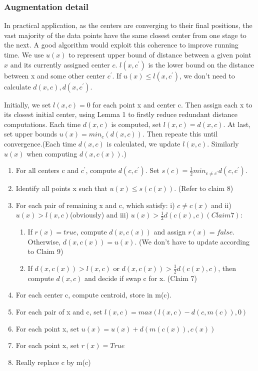 \documentclass[11pt]{article}
\begin{document}
\subsubsection{Augmentation detail}
In practical application, as the centers are converging to their final positions, the vast majority of the data points have the same closest center from one stage to the next. A good algorithm would exploit this coherence to improve running time. We use $u(x)$ to represent upper bound of distance between a given point $x$ and its currently assigned center $c$. $l(x,c^{\prime})$ is the lower bound on the distance between x and some other center $c^{\prime}$. If $u(x) \le l(x,c^{\prime}) $, we don't need to calculate $d(x,c), d(x, c^{\prime})$. \par
Initially, we set $l(x,c)=0$ for each point x and center c. Then assign each x to its closest initial center, using Lemma 1 to firstly reduce redundant distance computations. Each time $d(x,c)$ is computed, set $l(x,c)=d(x,c)$. At last, set upper bounds $u(x) = min_c(d(x,c))$. Then repeate this until convergence.(Each time $d(x,c)$ is calculated, we update $l(x,c)$. Similarly $u(x)$ when computing $d(x,c(x))$.)

\begin{enumerate}
\item For all centers c and $c^{\prime}$, compute $d(c, c^{\prime})$. Set $s(c) = \frac{1}{2}min_{c \ne c^{\prime}}d(c,c^{\prime})$.
\item Identify all points x such that $u(x) \le s(c(x))$. (Refer to claim 8)
\item For each pair of remaining x and c, which satisfy: i) $c \ne c(x)$ and ii) $u(x) > l(x,c)$(obviously) and iii) $u(x) > \frac{1}{2}d(c(x), c)(Claim 7)$: 
\begin{enumerate}
\item If $r(x) = true$, compute $d(x,c(x))$ and assign $r(x)=false$. Otherwise, $d(x,c(x)) = u(x).$ (We don't have to update according to Claim 9)
\item  If $d(x,c(x))> l(x,c)$ or $d(x,c(x)) > \frac{1}{2}d(c(x), c)$, then compute $d(x,c)$ and decide if swap c for x. (Claim 7)
\end{enumerate}
\item For each center c, compute centroid, store in m(c).
\item For each  pair of x and c, set $l(x,c) = max(l(x,c) - d(c,m(c)), 0)$
\item For each point x, set $u(x) = u(x) + d(m(c(x)), c(x))$
\item For each point x, set $r(x) = True$
\item Really replace c by m(c)
\end{enumerate}
\end{document}

